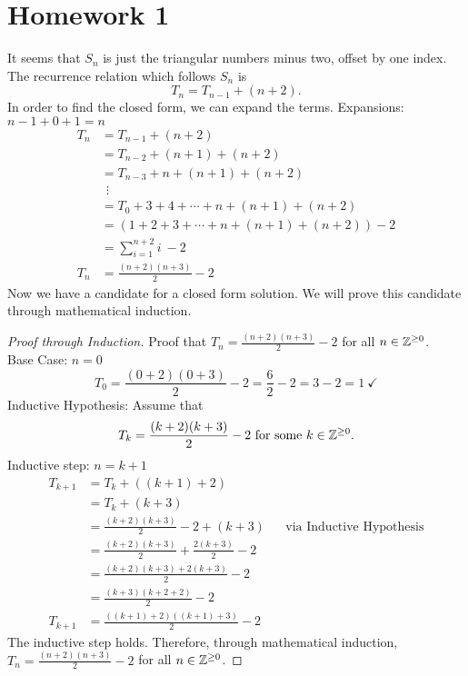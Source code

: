 \documentclass{article}
\newcommand{\assignment}{Homework 1}
\begin{document}
\section*{\assignment}

It seems that $S_n$ is just the triangular numbers minus two, offset by one index. The recurrence relation which follows $S_n$ is
\[
  T_n = T_{n-1} + (n+2).
\]
In order to find the closed form, we can expand the terms. Expansions: $n-1+0+1 = n$
\begin{align*}
  T_n & = T_{n-1} + (n+2)                              \\
      & = T_{n-2} + (n+1) + (n+2)                      \\
      & = T_{n-3} + n + (n+1) + (n+2)                  \\
      & ~~\vdots                                       \\
      & = T_{0} + 3 + 4 + \cdots + n + (n+1) + (n+2)   \\
      & = (1 + 2 + 3 + \cdots + n + (n+1) + (n+2)) - 2 \\
      & = \sum_{i=1}^{n+2} i ~- 2                      \\
  T_n & = \frac{(n+2)(n+3)}{2} - 2
\end{align*}
Now we have a candidate for a closed form solution. We will prove this candidate through mathematical induction.
\begin{proof}[Proof through Induction]
  Proof that $T_n = \frac{(n+2)(n+3)}{2} - 2$ for all $n \in \mathbb{Z}^{\geq 0}$. \\
  Base Case: $n = 0$
  \[
    T_0 = \frac{(0 + 2)(0 + 3)}{2} - 2 = \frac{6}{2} - 2 = 3 - 2 = 1~\checkmark
  \]
  Inductive Hypothesis: Assume that
  \[
    T_k = \frac{(k + 2)(k + 3)}{2} - 2~\text{for some}~k \in \mathbb{Z}^{\geq 0}.
  \]
  Inductive step: $n = k+1$
  \begin{align*}
    T_{k+1} & = T_k + ((k+1)+2)                                                                      \\
            & = T_k + (k+3)                                                                          \\
            & = \frac{(k + 2)(k + 3)}{2} - 2 + (k + 3)          &  & \text{via Inductive Hypothesis} \\
            & = \frac{(k + 2)(k + 3)}{2} + \frac{2(k+3)}{2} - 2                                      \\
            & = \frac{(k + 2)(k + 3) + 2(k+3)}{2} - 2                                                \\
            & = \frac{(k+3)(k+2+2)}{2} - 2                                                           \\
    T_{k+1} & = \frac{((k+1)+2)((k+1)+3)}{2} - 2
  \end{align*}
  The inductive step holds. Therefore, through mathematical induction, $T_n = \frac{(n+2)(n+3)}{2} - 2$ for all $n \in \mathbb{Z}^{\geq 0}$.
\end{proof}
\qdash
\end{document}

